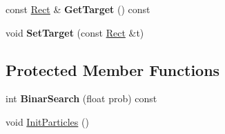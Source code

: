 \begin{DoxyCompactItemize}
\item 
\hypertarget{classParticleFilter_ad795d2552d8471903363755b3aa8534c}{}const \hyperlink{classRect}{Rect} \& {\bfseries Get\+Target} () const \label{classParticleFilter_ad795d2552d8471903363755b3aa8534c}

\item 
\hypertarget{classParticleFilter_ac4c0564bc3414b5ac156325d6bf6546e}{}void {\bfseries Set\+Target} (const \hyperlink{classRect}{Rect} \&t)\label{classParticleFilter_ac4c0564bc3414b5ac156325d6bf6546e}

\end{DoxyCompactItemize}
\subsection*{Protected Member Functions}
\begin{DoxyCompactItemize}
\item 
\hypertarget{classParticleFilter_a566b57dbca5caadbf1c9dce31b3407be}{}int {\bfseries Binar\+Search} (float prob) const \label{classParticleFilter_a566b57dbca5caadbf1c9dce31b3407be}

\item 
void \hyperlink{classParticleFilter_a0244f4fb69b92deb70aa470f2cc85ca4}{Init\+Particles} ()
\end{DoxyCompactItemize}
